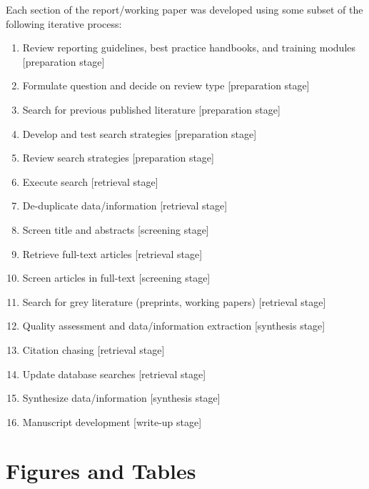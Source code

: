 \documentclass[11pt]{article}
\begin{document}
Each section of the report/working paper was developed using some subset of the following iterative process\autocite{tsafnat14}:
\begin{enumerate}
    \item Review reporting guidelines, best practice handbooks, and training modules [preparation stage]
    \item Formulate question and decide on review type [preparation stage]
    \item Search for previous published literature [preparation stage]
    \item Develop and test search strategies [preparation stage]
    \item Review search strategies [preparation stage]
    \item Execute search [retrieval stage]
    \item De-duplicate data/information [retrieval stage]
    \item Screen title and abstracts [screening stage]
    \item Retrieve full-text articles [retrieval stage]
    \item Screen articles in full-text [screening stage]
    \item Search for grey literature (preprints, working papers) [retrieval stage]
    \item Quality assessment and data/information extraction [synthesis stage]
    \item Citation chasing [retrieval stage]
    \item Update database searches [retrieval stage]
    \item Synthesize data/information [synthesis stage]
    \item Manuscript development [write-up stage]
\end{enumerate}

\newpage\clearpage

\section{Figures and Tables}
\end{document}
